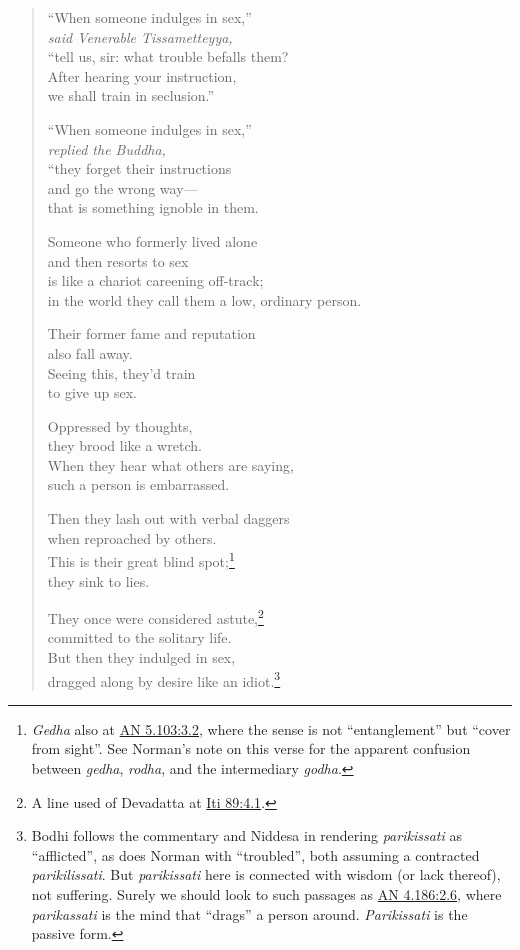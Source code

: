 \documentclass[12pt,openany]{book}%
\newcommand*{\scspeaker}[1]{\hspace{2em}\textit{#1}}
\begin{document}
\begin{verse}%
“When someone indulges in sex,” \\
\scspeaker{said Venerable Tissametteyya, }\\
“tell us, sir: what trouble befalls them? \\
After hearing your instruction, \\
we shall train in seclusion.” 

“When someone indulges in sex,” \\
\scspeaker{replied the Buddha, }\\
“they forget their instructions \\
and go the wrong way—\\
that is something ignoble in them. 

Someone who formerly lived alone \\
and then resorts to sex \\
is like a chariot careening off-track; \\
in the world they call them a low, ordinary person. 

Their former fame and reputation \\
also fall away. \\
Seeing this, they’d train \\
to give up sex. 

Oppressed by thoughts, \\
they brood like a wretch. \\
When they hear what others are saying, \\
such a person is embarrassed. 

Then they lash out with verbal daggers \\
when reproached by others. \\
This is their great blind spot;\footnote{\textit{Gedha} also at \href{https://suttacentral.net/an5.103/en/sujato\#3.2}{AN 5.103:3.2}, where the sense is not “entanglement” but “cover from sight”. See Norman’s note on this verse for the apparent confusion between \textit{gedha}, \textit{rodha}, and the intermediary \textit{godha}. } \\
they sink to lies. 

They once were considered astute,\footnote{A line used of Devadatta at \href{https://suttacentral.net/iti89/en/sujato\#4.1}{Iti 89:4.1}. } \\
committed to the solitary life. \\
But then they indulged in sex, \\
dragged along by desire like an idiot.\footnote{Bodhi follows the commentary and Niddesa in rendering \textit{parikissati} as “afflicted”, as does Norman with “troubled”, both assuming a contracted \textit{parikilissati}. But \textit{parikissati} here is connected with wisdom (or lack thereof), not suffering. Surely we should look to such passages as \href{https://suttacentral.net/an4.186/en/sujato\#2.6}{AN 4.186:2.6}, where \textit{parikassati} is the mind that “drags” a person around. \textit{Parikissati} is the passive form. } 


\end{verse}
\end{document}
